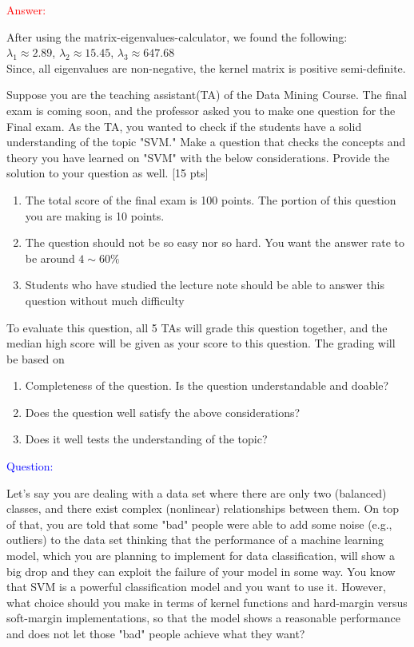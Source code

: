 \documentclass{homework}
\begin{document}
    \textcolor{red}{Answer:}
    
    After using the matrix-eigenvalues-calculator, we found the following: \\
    $\lambda_1 \approx 2.89$, \quad $\lambda_2 \approx 15.45$, \quad$ \lambda_3 \approx 647.68 $ \\
    Since, all eigenvalues are non-negative, the kernel matrix is positive semi-definite. 
    
    \vspace{10mm}
    
    \exercise*
    Suppose you are the teaching assistant(TA) of the Data Mining Course. The final exam is coming soon, and the professor asked you to make one question for the Final exam. As the TA, you wanted to check if the students have a solid understanding of the topic "SVM." Make a question that checks the concepts and theory you have learned on "SVM" with the below considerations. Provide the solution to your question as well. [15 pts]
    \begin{enumerate}
        \item The total score of the final exam is 100 points. The portion of this question you are making is 10 points.
        \item The question should not be so easy nor so hard. You want the answer rate to be around $ 4\sim 60\%$  
        \item Students who have studied the lecture note should be able to answer this question without much difficulty
    \end{enumerate}
    
    To evaluate this question, all 5 TAs will grade this question together, and the median high score will be given as your score to this question. The grading will be based on 
    \begin{enumerate}
        \item Completeness of the question. Is the question understandable and doable?
        \item Does the question well satisfy the above considerations?
        \item Does it well tests the understanding of the topic?
    \end{enumerate}
    
    \textcolor{blue}{Question:}
    
    Let's say you are dealing with a data set where there are only two (balanced) classes, and there exist complex (nonlinear) relationships between them. On top of that, you are told that some "bad" people were able to add some noise (e.g., outliers) to the data set thinking that the performance of a machine learning model, which you are planning to implement for data classification, will show a big drop and they can exploit the failure of your model in some way. You know that SVM is a powerful classification model and you want to use it. However, what choice should you make in terms of kernel functions and hard-margin versus soft-margin implementations, so that the model shows a reasonable performance and does not let those "bad" people achieve what they want?
    
\end{document}
